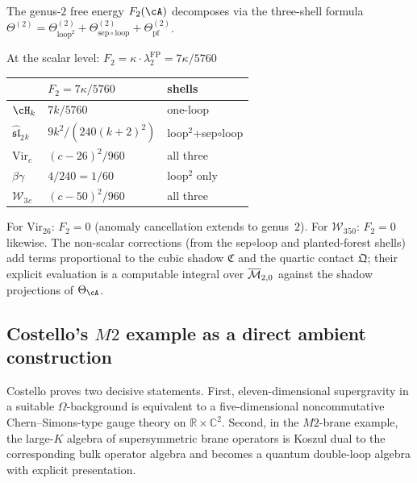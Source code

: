 \begin{computation}
The genus-$2$ free energy $F_2(\cA)$ decomposes via the
three-shell formula
$\Theta^{(2)}=\Theta^{(2)}_{\mathrm{loop}^2}
+\Theta^{(2)}_{\mathrm{sep}\circ\mathrm{loop}}
+\Theta^{(2)}_{\mathrm{pf}}$.

At the scalar level:
$F_2=\kappa\cdot\lambda_2^{\mathrm{FP}}=7\kappa/5760$

\begin{center}
\renewcommand{\arraystretch}{1.2}
\begin{tabular}{lll}
& $F_2=7\kappa/5760$ & shells \\
\hline
$\cH_k$ & $7k/5760$ & one-loop \\
$\widehat{\mathfrak{sl}}_2{}_k$
 & $9k^2/(240(k{+}2)^2)$
 & loop$^2$+sep$\circ$loop \\
$\mathrm{Vir}_c$ & $(c{-}26)^2/960$
 & all three \\
$\beta\gamma$ & $4/240=1/60$ & loop$^2$ only \\
$\mathcal W_3{}_c$ & $(c{-}50)^2/960$
 & all three
\end{tabular}
\end{center}
For $\mathrm{Vir}_{26}$: $F_2=0$ (anomaly cancellation extends
to genus~$2$). For $\mathcal W_3{}_{50}$: $F_2=0$ likewise.
The non-scalar corrections (from the sep$\circ$loop and
planted-forest shells) add terms proportional to the cubic
shadow $\mathfrak C$ and the quartic contact $\mathfrak Q$;
their explicit evaluation is a computable integral over
$\overline{\mathcal M}_{2,0}$ against the shadow projections of
$\Theta_\cA$.
\end{computation}

\subsection{Costello's \texorpdfstring{$M2$}{M2} example as a direct ambient construction}

Costello proves two decisive statements. First, eleven-dimensional
supergravity in a suitable $\Omega$-background is equivalent to a
five-dimensional noncommutative Chern--Simons-type gauge theory on
$\mathbb{R} \times \mathbb{C}^2$. Second, in the $M2$-brane
example, the large-$K$ algebra of supersymmetric brane operators is
Koszul dual to the corresponding bulk operator algebra and becomes
a quantum double-loop algebra with explicit presentation.

